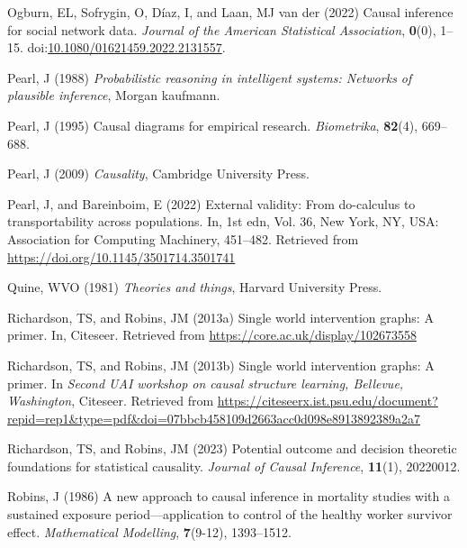 \documentclass[
  single column]{article}
\newlength{\cslhangindent}
\newenvironment{CSLReferences}[2] %
 {\begin{list}{}{%
  \setlength{\itemindent}{0pt}
  \setlength{\leftmargin}{0pt}
  \setlength{\parsep}{0pt}
  \ifodd #1
   \setlength{\leftmargin}{\cslhangindent}
   \setlength{\itemindent}{-1\cslhangindent}
  \fi
  \setlength{\itemsep}{#2\baselineskip}}}
 {\end{list}}
\begin{document}
\begin{CSLReferences}{1}{0}
Ogburn, EL, Sofrygin, O, Díaz, I, and Laan, MJ van der (2022) Causal
inference for social network data. \emph{Journal of the American
Statistical Association}, \textbf{0}(0), 1--15.
doi:\href{https://doi.org/10.1080/01621459.2022.2131557}{10.1080/01621459.2022.2131557}.

Pearl, J (1988) \emph{Probabilistic reasoning in intelligent systems:
Networks of plausible inference}, Morgan kaufmann.

Pearl, J (1995) Causal diagrams for empirical research.
\emph{Biometrika}, \textbf{82}(4), 669--688.

Pearl, J (2009) \emph{Causality}, Cambridge University Press.

Pearl, J, and Bareinboim, E (2022) External validity: From do-calculus
to transportability across populations. In, 1st edn, Vol. 36, New York,
NY, USA: Association for Computing Machinery, 451--482. Retrieved from
\url{https://doi.org/10.1145/3501714.3501741}

Quine, WVO (1981) \emph{Theories and things}, Harvard University Press.

Richardson, TS, and Robins, JM (2013a) Single world intervention graphs:
A primer. In, Citeseer. Retrieved from
\url{https://core.ac.uk/display/102673558}

Richardson, TS, and Robins, JM (2013b) Single world intervention graphs:
A primer. In \emph{Second UAI workshop on causal structure learning,
{B}ellevue, {W}ashington}, Citeseer. Retrieved from
\url{https://citeseerx.ist.psu.edu/document?repid=rep1&type=pdf&doi=07bbcb458109d2663acc0d098e8913892389a2a7}

Richardson, TS, and Robins, JM (2023) Potential outcome and decision
theoretic foundations for statistical causality. \emph{Journal of Causal
Inference}, \textbf{11}(1), 20220012.

Robins, J (1986) A new approach to causal inference in mortality studies
with a sustained exposure period---application to control of the healthy
worker survivor effect. \emph{Mathematical Modelling}, \textbf{7}(9-12),
1393--1512.


\end{CSLReferences}
\end{document}
